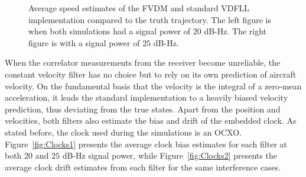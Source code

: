 \begin{figure}[!ht]
\begin{subfigure}{.45\textwidth}
    \end{subfigure}
    \caption{Average speed estimates of the FVDM and standard VDFLL implementation compared to the truth trajectory. The left figure is when both simulations had a signal power of \(20\) dB-Hz. The right figure is with a signal power of \(25\) dB-Hz.}\label{fig:Speed1}
\end{figure}

When the correlator measurements from the receiver become unreliable, the constant velocity filter has no choice but to rely on its own prediction of aircraft velocity. On the fundamental basis that the velocity is the integral of a zero-mean acceleration, it leads the standard implementation to a heavily biased velocity prediction, thus deviating from the true states. Apart from the position and velocities, both filters also estimate the bias and drift of the embedded clock. As stated before, the clock used during the simulations is an OCXO\@. Figure~\ref{fig:Clocks1} presents the average clock bias estimates for each filter at both \(20\) and \(25\) dB-Hz signal power, while Figure~\ref{fig:Clocks2} presents the average clock drift estimates from each filter for the same interference cases.


